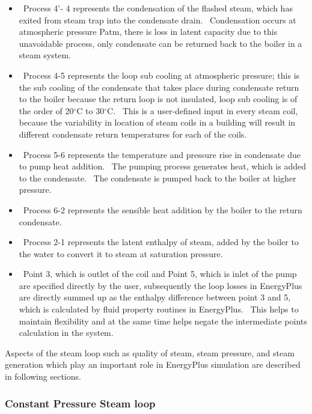 \begin{itemize}
\item
  ~Process 4'- 4 represents the condensation of the flashed steam, which has exited from steam trap into the condensate drain.~ Condensation occurs at atmospheric pressure Patm, there is loss in latent capacity due to this unavoidable process, only condensate can be returned back to the boiler in a steam system.
\item
  ~Process 4-5 represents the loop sub cooling at atmospheric pressure; this is the sub cooling of the condensate that takes place during condensate return to the boiler because the return loop is not insulated, loop sub cooling is of the order of 20\(^{\circ}\)C to 30\(^{\circ}\)C.~ This is a user-defined input in every steam coil, because the variability in location of steam coils in a building will result in different condensate return temperatures for each of the coils.
\item
  ~Process 5-6 represents the temperature and pressure rise in condensate due to pump heat addition.~ The pumping process generates heat, which is added to the condensate.~ The condensate is pumped back to the boiler at higher pressure.
\item
  ~Process 6-2 represents the sensible heat addition by the boiler to the return condensate.
\item
  ~Process 2-1 represents the latent enthalpy of steam, added by the boiler to the water to convert it to steam at saturation pressure.
\item
  ~Point 3, which is outlet of the coil and Point 5, which is inlet of the pump are specified directly by the user, subsequently the loop losses in EnergyPlus are directly summed up as the enthalpy difference between point 3 and 5, which is calculated by fluid property routines in EnergyPlus.~ This helps to maintain flexibility and at the same time helps negate the intermediate points calculation in the system.
\end{itemize}

Aspects of the steam loop such as quality of steam, steam pressure, and steam generation which play an important role in EnergyPlus simulation are described in following sections.

\subsubsection{Constant Pressure Steam loop}\label{constant-pressure-steam-loop}

